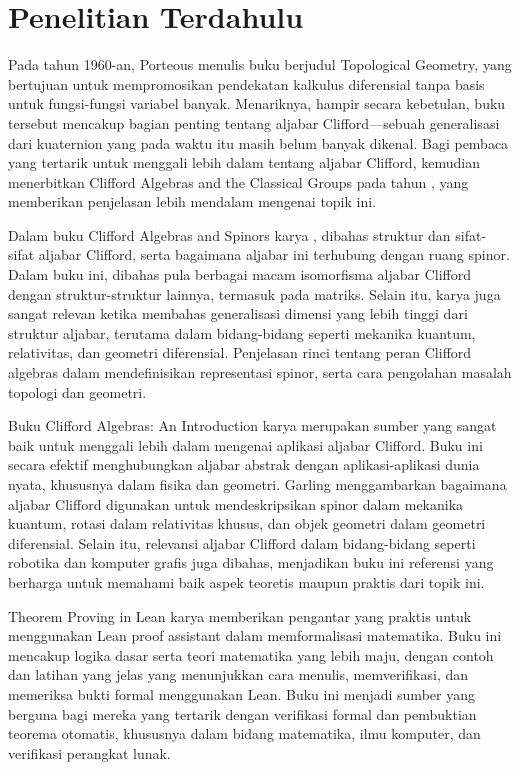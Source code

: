 \section{Penelitian Terdahulu}

Pada tahun 1960-an, Porteous menulis buku berjudul Topological Geometry, yang bertujuan untuk mempromosikan pendekatan kalkulus diferensial tanpa basis untuk fungsi-fungsi variabel banyak. Menariknya, hampir secara kebetulan, buku tersebut mencakup bagian penting tentang aljabar Clifford—sebuah generalisasi dari kuaternion yang pada waktu itu masih belum banyak dikenal. Bagi pembaca yang tertarik untuk menggali lebih dalam tentang aljabar Clifford, \citeauthor{Porteous1995} kemudian menerbitkan Clifford Algebras and the Classical Groups pada tahun \citeyear{Porteous1995}, yang memberikan penjelasan lebih mendalam mengenai topik ini.

Dalam buku Clifford Algebras and Spinors karya \cite{Lounesto2001}, dibahas struktur dan sifat-sifat aljabar Clifford, serta bagaimana aljabar ini terhubung dengan ruang spinor. Dalam buku ini, dibahas pula berbagai macam isomorfisma aljabar Clifford dengan struktur-struktur lainnya, termasuk pada matriks. Selain itu, karya \citeauthor{Lounesto2001} juga sangat relevan ketika membahas generalisasi dimensi yang lebih tinggi dari struktur aljabar, terutama dalam bidang-bidang seperti mekanika kuantum, relativitas, dan geometri diferensial. Penjelasan rinci tentang peran Clifford algebras dalam mendefinisikan representasi spinor, serta cara pengolahan masalah topologi dan geometri.

Buku Clifford Algebras: An Introduction karya \cite{Garling2011} merupakan sumber yang sangat baik untuk menggali lebih dalam mengenai aplikasi aljabar Clifford. Buku ini secara efektif menghubungkan aljabar abstrak dengan aplikasi-aplikasi dunia nyata, khususnya dalam fisika dan geometri. Garling menggambarkan bagaimana aljabar Clifford digunakan untuk mendeskripsikan spinor dalam mekanika kuantum, rotasi dalam relativitas khusus, dan objek geometri dalam geometri diferensial. Selain itu, relevansi aljabar Clifford dalam bidang-bidang seperti robotika dan komputer grafis juga dibahas, menjadikan buku ini referensi yang berharga untuk memahami baik aspek teoretis maupun praktis dari topik ini.

Theorem Proving in Lean karya \cite{Avigad2024} memberikan pengantar yang praktis untuk menggunakan Lean proof assistant dalam memformalisasi matematika. Buku ini mencakup logika dasar serta teori matematika yang lebih maju, dengan contoh dan latihan yang jelas yang menunjukkan cara menulis, memverifikasi, dan memeriksa bukti formal menggunakan Lean. Buku ini menjadi sumber yang berguna bagi mereka yang tertarik dengan verifikasi formal dan pembuktian teorema otomatis, khususnya dalam bidang matematika, ilmu komputer, dan verifikasi perangkat lunak.

